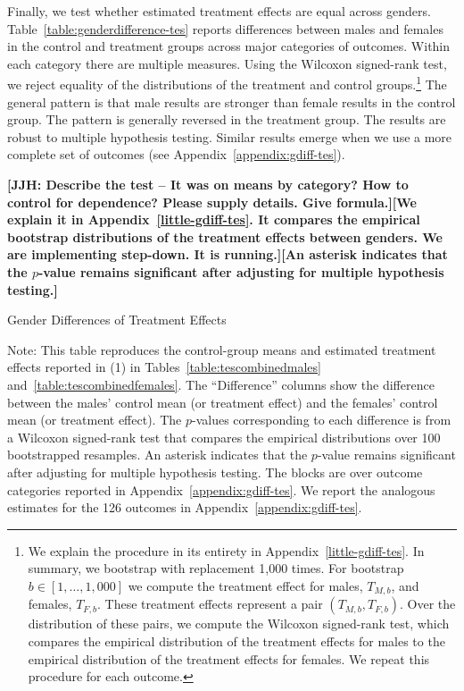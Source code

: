Finally, we test whether estimated treatment effects are equal across genders. Table~\ref{table:genderdifference-tes} reports differences between males and females in the control and treatment groups across major categories of outcomes. Within each category there are multiple measures. Using the Wilcoxon signed-rank test, we reject equality of the distributions of the treatment and control groups.\footnote{We explain the procedure in its entirety in Appendix~\ref{little-gdiff-tes}. In summary, we bootstrap with replacement 1,000 times. For bootstrap $b \in [1, \ldots, 1,000]$ we compute the treatment effect for males, $T_{M,b}$, and females, $T_{F,b}$. These treatment effects represent a pair $(T_{M,b}, T_{F,b})$. Over the distribution of these pairs, we compute the Wilcoxon signed-rank test, which compares the empirical distribution of the treatment effects for males to the empirical distribution of the treatment effects for females. We repeat this procedure for each outcome.} The general pattern is that male results are stronger than female results in the control group. The pattern is generally reversed in the treatment group. The results are robust to multiple hypothesis testing. Similar results emerge when we use a more complete set of outcomes (see Appendix~\ref{appendix:gdiff-tes}).

\begin{table}
\textbf{[JJH: Describe the test -- It was on means by category? How to control for dependence? Please supply details. Give formula.][We explain it in Appendix~\ref{little-gdiff-tes}. It compares the empirical bootstrap distributions of the treatment effects between genders. We are implementing step-down. It is running.][An asterisk indicates that the $p$-value remains significant after adjusting for multiple hypothesis testing.]}
\centering
\begin{threeparttable}
\caption{Gender Differences of Treatment Effects}\label{table:genderdifference-tes}
\begin{scriptsize}

\end{scriptsize}
\begin{tablenotes}
\scriptsize
Note: This table reproduces the control-group means and estimated treatment effects reported in (1) in Tables~\ref{table:tescombinedmales} and~\ref{table:tescombinedfemales}. The ``Difference'' columns show the difference between the males' control mean (or treatment effect) and the females' control mean (or treatment effect). The $p$-values corresponding to each difference is from a Wilcoxon signed-rank test that compares the empirical distributions over 100 bootstrapped resamples. An asterisk indicates that the $p$-value remains significant after adjusting for multiple hypothesis testing. The blocks are over outcome categories reported in Appendix~\ref{appendix:gdiff-tes}. We report the analogous estimates for the 126 outcomes in Appendix~\ref{appendix:gdiff-tes}.
\end{tablenotes}
\end{threeparttable}
\end{table}

